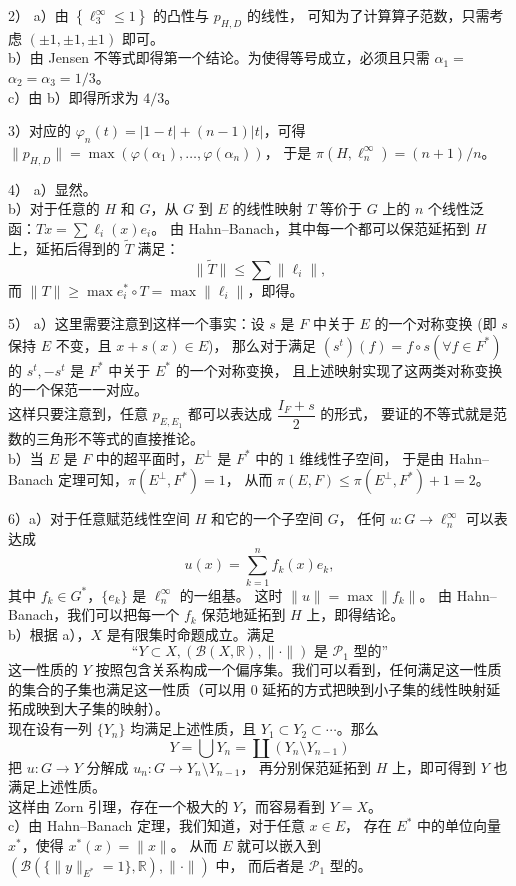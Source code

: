 \begin{enumerate}
\begin{proofc}
2）
a）由 $\left\{\ell_{3}^{\infty} \leqslant 1\right\}$ 的凸性与 $p_{H, D}$ 的线性，
可知为了计算算子范数，只需考虑 $( \pm 1, \pm 1, \pm 1)$ 即可。\\
b）由 Jensen 不等式即得第一个结论。为使得等号成立，必须且只需 $\alpha_{1}=$ $\alpha_{2}=\alpha_{3}=1 / 3$。\\
c）由 b）即得所求为 $4 / 3$。

3）对应的 $\varphi_{n}(t)=|1-t|+(n-1)|t|$，可得 $\|p_{H, D}\|=\max (\varphi(\alpha_{1}), \ldots, \varphi(\alpha_{n}))$，
于是 $\pi(H, \ell_{n}^{\infty})=(n+1) / n$。

4）
a）显然。\\
b）对于任意的 $H$ 和 $G$，从 $G$ 到 $E$ 的线性映射 $T$ 等价于 $G$ 上的 $n$ 个线性泛函：$T x=\sum \ell_{i}(x) e_{i}$。
由 Hahn--Banach，其中每一个都可以保范延拓到 $H$ 上，延拓后得到的 $\widetilde{T}$ 满足：
$$\|\widetilde{T}\| \leqslant \sum\|\ell_{i}\|,$$
而 $\|T\| \geqslant \max e_{i}^{*} \circ T=\max \|\ell_{i}\|$，即得。

5）
a）这里需要注意到这样一个事实：设 $s$ 是 $F$ 中关于 $E$ 的一个对称变换 (即 $s$ 保持 $E$ 不变，且 $x+s(x) \in E$)，
那么对于满足 $(s^{t})(f)=f \circ s\left(\forall f \in F^{*}\right)$ 的 $s^{t},-s^{t}$ 是 $F^{*}$ 中关于 $E^{*}$ 的一个对称变换，
且上述映射实现了这两类对称变换的一个保范一一对应。\\
这样只要注意到，任意 $p_{E, E_{1}}$ 都可以表达成 $\dfrac{I_{F}+s}{2}$ 的形式，
要证的不等式就是范数的三角形不等式的直接推论。\\
b）当 $E$ 是 $F$ 中的超平面时，$E^{\perp}$ 是 $F^{*}$ 中的 $1$ 维线性子空间，
于是由 Hahn--Banach 定理可知，$\pi(E^{\perp}, F^{*})=1$，
从而 $\pi(E, F) \leqslant \pi(E^{\perp}, F^{*})+1=2$。

6）a）对于任意赋范线性空间 $H$ 和它的一个子空间 $G$，
任何 $u: G \rightarrow \ell_{n}^{\infty}$ 可以表达成
$$u(x)=\sum_{k=1}^{n} f_{k}(x) e_{k},$$
其中 $f_{k} \in G^{*}$，$\{e_{k}\}$ 是 $\ell_{n}^{\infty}$ 的一组基。
这时 $\|u\|=\max \|f_{k}\|$。
由 Hahn--Banach，我们可以把每一个 $f_{k}$ 保范地延拓到 $H$ 上，即得结论。\\
b）根据 a），$X$ 是有限集时命题成立。满足
$$\text{``}Y \subset X,(\mathcal{B}(X, \mathbb{R}),\|\cdot\|) \text { 是 } \mathcal{P}_{1} \text { 型的''}$$
这一性质的 $Y$ 按照包含关系构成一个偏序集。我们可以看到，任何满足这一性质的集合的子集也满足这一性质（可以用 $0$ 延拓的方式把映到小子集的线性映射延拓成映到大子集的映射）。\\
现在设有一列 $\{Y_{n}\}$ 均满足上述性质，且 $Y_{1} \subset Y_{2} \subset \cdots$。那么
$$Y=\bigcup Y_{n}=\coprod(Y_{n} \setminus Y_{n-1})$$
把 $u: G \rightarrow Y$ 分解成 $u_{n}: G \rightarrow Y_{n} \setminus Y_{n-1}$，
再分别保范延拓到 $H$ 上，即可得到 $Y$ 也满足上述性质。\\
这样由 Zorn 引理，存在一个极大的 $Y$，而容易看到 $Y=X$。\\
c）由 Hahn--Banach 定理，我们知道，对于任意 $x \in E$，
存在 $E^{*}$ 中的单位向量 $x^{*}$，使得 $x^*(x)=\|x\|$。
从而 $E$ 就可以嵌入到 $(\mathcal{B}(\{\|y\|_{E^{*}}=1\}, \mathbb{R}),\|\cdot\|)$ 中，
而后者是 $\mathcal{P}_{1}$ 型的。


\end{proofc}
\end{enumerate}
